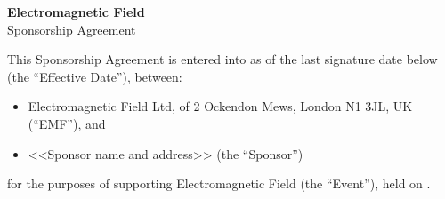

\selectfont

\begin{center}
{\bf \LARGE Electromagnetic Field \eventyear}\\[12pt]
{\Large Sponsorship Agreement}
\end{center}

This Sponsorship Agreement is entered into as of the last signature date below (the ``Effective Date''), between:
\begin{itemize}
    \item Electromagnetic Field Ltd, of 2 Ockendon Mews, London N1 3JL, UK (``EMF''), and
    \item <<Sponsor name and address>> (the ``Sponsor'')
\end{itemize}

for the purposes of supporting Electromagnetic Field \eventyear (the ``Event''), held on \eventdates.

